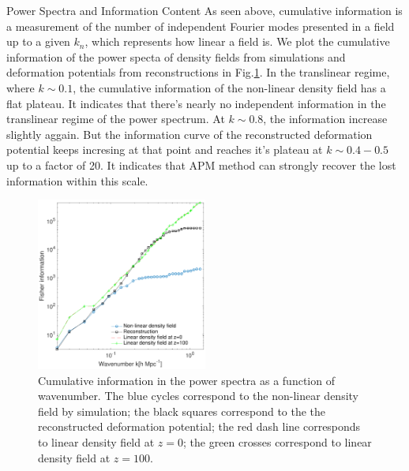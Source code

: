 \begin{section}{Power Spectra and Information Content}
As seen above, cumulative information is a measurement of the number of independent Fourier modes presented in a field up to a given $k_n$, which represents how linear a field is. We plot the cumulative information of the power specta of density fields from simulations and deformation potentials from reconstructions in Fig.\ref{fig:fisherinfo}. In the translinear regime, where $k\sim0.1$, the cumulative information of the non-linear density field has a flat plateau. It indicates that there's nearly no independent information in the translinear regime of the power spectrum. At $k\sim0.8$, the information increase slightly aggain. But the information curve of the reconstructed deformation potential keeps incresing at that point and reaches it's plateau at $k\sim0.4-0.5$ up to a factor of 20. It indicates that APM method can strongly recover the lost information within this scale. 
\begin{figure}[htbp]
 \begin{center}
  \includegraphics[width=0.5\textwidth]{fishernew-crop.pdf}
   \caption{Cumulative information in the power spectra as a function of wavenumber. The blue cycles correspond to the non-linear density field by simulation; the black squares correspond to the the reconstructed deformation potential; the red dash line corresponds to linear density field at $z=0$; the green crosses correspond to linear density field at $z=100$.}
  \label{fig:fisherinfo}
 \end{center}
\end{figure}


\end{section}
